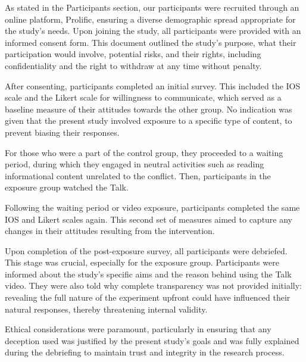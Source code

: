 \documentclass[stu,12pt,floatsintext]{apa7}
\begin{document}
As stated in the Participants section, our participants were recruited through an online platform, Prolific, ensuring a diverse demographic spread appropriate for the study's needs. Upon joining the study, all participants were provided with an informed consent form. This document outlined the study's purpose, what their participation would involve, potential risks, and their rights, including confidentiality and the right to withdraw at any time without penalty.

After consenting, participants completed an initial survey. This included the IOS scale and the Likert scale for willingness to communicate, which served as a baseline measure of their attitudes towards the other group. No indication was given that the present study involved exposure to a specific type of content, to prevent biasing their responses.

For those who were a part of the control group, they proceeded to a waiting period, during which they engaged in neutral activities such as reading informational content unrelated to the conflict. Then, participants in the exposure group watched the \textcite{tedvideo} Talk.

Following the waiting period or video exposure, participants completed the same IOS and Likert scales again. This second set of measures aimed to capture any changes in their attitudes resulting from the intervention.

Upon completion of the post-exposure survey, all participants were debriefed. This stage was crucial, especially for the exposure group. Participants were informed about the study's specific aims and the reason behind using the \textcite{tedvideo} Talk video. They were also told why complete transparency was not provided initially: revealing the full nature of the experiment upfront could have influenced their natural responses, thereby threatening internal validity.

Ethical considerations were paramount, particularly in ensuring that any deception used was justified by the present study's goals and was fully explained during the debriefing to maintain trust and integrity in the research process.


\printbibliography
\end{document}
